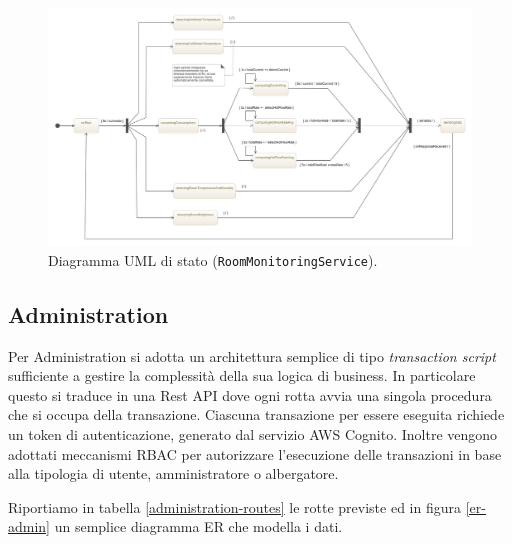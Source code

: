 \begin{figure}[H]
    \centering
    \includegraphics[width=\textwidth]{images/room-monitoring-service-state-diagram.jpeg}\hfill
    \caption{\label{rm-uml-state}Diagramma UML di stato (\texttt{RoomMonitoringService}).}
\end{figure}

\subsection{Administration}

Per Administration si adotta un architettura semplice di tipo \textit{transaction script} sufficiente a gestire la complessità della sua logica di business.
In particolare questo si traduce in una Rest API dove ogni rotta avvia una singola procedura che si occupa della transazione.
Ciascuna transazione per essere eseguita richiede un token di autenticazione, generato dal servizio AWS Cognito. 
Inoltre vengono adottati meccanismi RBAC per autorizzare l'esecuzione delle transazioni in base alla tipologia di utente, amministratore o albergatore.

Riportiamo in tabella \ref*{administration-routes} le rotte previste ed in figura \ref*{er-admin} un semplice diagramma ER che modella i dati.

